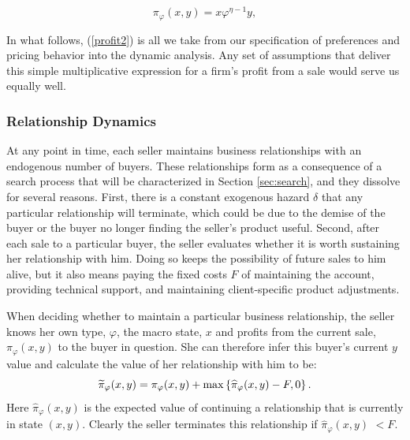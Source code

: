 \begin{equation}
\pi _{\varphi }(x,y)=x\varphi ^{\eta -1}y,  \label{profit2}
\end{equation}
\qquad \qquad

In what follows, (\ref{profit2}) is all we take from our specification of
preferences and pricing behavior into the dynamic analysis. Any set of
assumptions that deliver this simple multiplicative expression for a firm's
profit from a sale would serve us equally well.

\subsubsection{Relationship Dynamics}

At any point in time, each seller maintains business relationships with an
endogenous number of buyers. These relationships form as a consequence of a
search process that will be characterized in Section \ref{sec:search}, and they
dissolve for several reasons. First, there is a constant exogenous hazard $%
\delta $ that any particular relationship will terminate, which could be due
to the demise of the buyer or the buyer no longer finding the seller's
product useful. Second, after each sale to a particular buyer, the seller
evaluates whether it is worth sustaining her relationship with him. Doing so
keeps the possibility of future sales to him alive, but it also means paying
the fixed costs $F$ of maintaining the account, providing technical support,
and maintaining client-specific product adjustments.\footnotemark{}

When deciding whether to maintain a particular business relationship, the
seller knows her own type, $\varphi $, the macro state, $x$ and profits from
the current sale, $\pi _{\varphi }(x,y)$ to the buyer in question. She can
therefore infer this buyer's current $y$ value and calculate the value of
her relationship with him to be:%
\begin{equation*}
\widetilde{\pi }_{\varphi }(x,y)=\pi _{\varphi }(x,y)+\max \left\{ \widehat{%
\pi }_{\varphi }(x,y)-F,0\right\} .
\end{equation*}%
Here $\widehat{\pi }_{\varphi }(x,y)$ is the expected value of continuing a
relationship that is currently in state $(x,y).$ Clearly the seller
terminates this relationship if $\widehat{\pi }_{\varphi }(x,y)$ $<F.$

